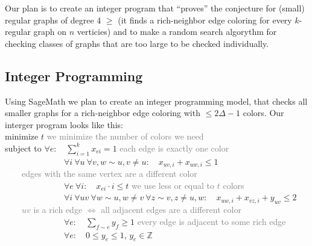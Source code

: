 \documentclass[12pt,a4paper]{amsart}
\theoremstyle{definition} %
\theoremstyle{plain} %
\newcommand{\Z}{\mathbb Z}
\begin{document}
Our plan is to create an integer program that ``proves'' the conjecture for (small) regular graphs of degree 4 $\geq$ (it finds a rich-neighbor edge coloring for every $k$-regular graph on $n$ verticies) and to make a random search algorythm for checking classes of graphs that are too large to be checked individually.

\subsection{Integer Programming}

Using SageMath we plan to create an integer programming model, that checks all smaller graphs for a rich-neighbor edge coloring with $\leq 2 \Delta - 1$ colors. Our interger program looks like this:\\

minimize $t$ \hfill \textcolor{gray}{we minimize the number of colors we need}\\

subject to $\forall e: \quad \sum_{i=1}^{k} x_{ei} = 1$ \hfill \textcolor{gray}{each edge is exactly one color}\\

\ \ \ \ \ \ \ \ \ \ \ \ \ \ $\forall i \ \forall u \ \forall v, w \sim u, v \neq u: \quad x_{uv, i} + x_{uw, i} \leq 1$\\[0.1mm]
\textcolor{white}{hihi} \hfill \textcolor{gray}{edges with the same vertex are a different color}\\

\ \ \ \ \ \ \ \ \ \ \ \ \ \ $\forall e \ \forall i: \quad x_{ei} \cdot i \leq t$ \hfill \textcolor{gray}{we use less or equal to $t$ colors}\\

\ \ \ \ \ \ \ \ \ \ \ \ \ \ $\forall i \ \forall uv \ \forall w \sim u, w \neq v \ \forall z \sim v, z \neq u, w: \quad x_{uw, i} + x_{vz, i} + y_{uv} \leq 2$ \hfill \\[0.1mm]
\textcolor{white}{hihi} \hfill \textcolor{gray}{$uv$ is a rich edge $\Leftrightarrow$ all adjacent edges are a different color}\\

\ \ \ \ \ \ \ \ \ \ \ \ \ \ $\forall e: \quad \sum_{f \sim e}y_f \geq 1$ \hfill \textcolor{gray}{every edge is adjacent to some rich edge}\\

\ \ \ \ \ \ \ \ \ \ \ \ \ \ $\forall e: \quad 0 \leq y_{e} \leq 1$, $y_{e} \in \Z$\\
\end{document}
